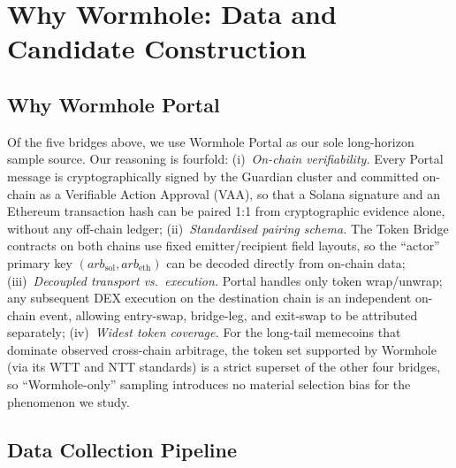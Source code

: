 \documentclass[sigconf,nonacm,10pt]{acmart}
\begin{document}
\section{Why Wormhole: Data and Candidate Construction}
\label{sec:data}

\subsection{Why Wormhole Portal}

Of the five bridges above, we use Wormhole Portal as our sole
long-horizon sample source. Our reasoning is fourfold:
(i)~\emph{On-chain verifiability.} Every Portal message is
cryptographically signed by the Guardian cluster and committed
on-chain as a Verifiable Action Approval (VAA), so that a Solana
signature and an Ethereum transaction hash can be paired 1:1 from
cryptographic evidence alone, without any off-chain ledger;
(ii)~\emph{Standardised pairing schema.} The Token Bridge contracts
on both chains use fixed emitter/recipient field layouts, so the
``actor'' primary key
$(arb_{\mathrm{sol}}, arb_{\mathrm{eth}})$ can be decoded directly
from on-chain data;
(iii)~\emph{Decoupled transport vs.\ execution.} Portal handles only
token wrap/unwrap; any subsequent DEX execution on the destination
chain is an independent on-chain event, allowing entry-swap,
bridge-leg, and exit-swap to be attributed separately;
(iv)~\emph{Widest token coverage.} For the long-tail memecoins that
dominate observed cross-chain arbitrage, the token set supported
by Wormhole (via its WTT and NTT standards) is a strict superset of
the other four bridges, so ``Wormhole-only'' sampling introduces no
material selection bias for the phenomenon we study.

\subsection{Data Collection Pipeline}
\label{sec:pipeline}
\end{document}
